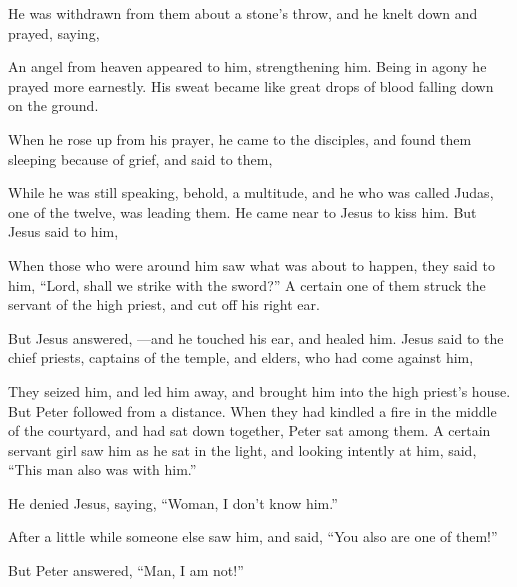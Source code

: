 {{}
\par }{\PP {}He was withdrawn from them about a stone’s throw, and he knelt down and prayed,
saying,
{}
\par }{\PP {}An angel from heaven appeared to him, strengthening him.
Being in agony he prayed more earnestly. His sweat became like great drops of blood falling down on the ground.
\par }{\PP {}When he rose up from his prayer, he came to the disciples, and found them sleeping because of grief,
and said to them,
{}
\par }{\PP {}While he was still speaking, behold, a multitude, and he who was called Judas, one of the twelve, was leading them. He came near to Jesus to kiss him.
But Jesus said to him,
{}
\par }{\PP {}When those who were around him saw what was about to happen, they said to him, “Lord, shall we strike with the sword?”
A certain one of them struck the servant of the high priest, and cut off his right ear.
\par }{\PP {}But Jesus answered,
{}—and he touched his ear, and healed him.
Jesus said to the chief priests, captains of the temple, and elders, who had come against him,
{}
\par }{\PP {}They seized him, and led him away, and brought him into the high priest’s house. But Peter followed from a distance.
When they had kindled a fire in the middle of the courtyard, and had sat down together, Peter sat among them.
A certain servant girl saw him as he sat in the light, and looking intently at him, said, “This man also was with him.”
\par }{\PP {}He denied Jesus, saying, “Woman, I don’t know him.”
\par }{\PP {}After a little while someone else saw him, and said, “You also are one of them!”
\par }{\PP But Peter answered, “Man, I am not!”
}
